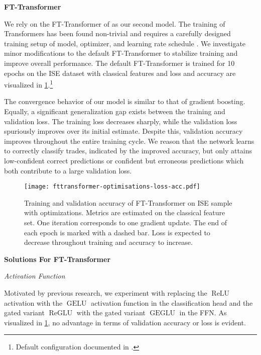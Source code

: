 \textbf{FT-Transformer}

We rely on the FT-Transformer of \textcite[][18935--18936]{gorishniyRevisitingDeepLearning2021} as our second model. The training of Transformers has been found non-trivial and requires a carefully designed training setup of model, optimizer, and learning rate schedule \autocite[][5747]{liuUnderstandingDifficultyTraining2020}. We investigate minor modifications to the default FT-Transformer to stabilize training and improve overall performance. The default FT-Transformer is trained for 10 epochs on the \gls{ISE} dataset with classical features and loss and accuracy are visualized in \cref{fig:fttransformer-optimizations-loss-acc}.\footnote{Default configuration documented in \textcite[][sup.]{gorishniyRevisitingDeepLearning2021}.}

The convergence behavior of our model is similar to that of gradient boosting. Equally, a significant generalization gap exists between the training and validation loss. The training loss decreases sharply, while the validation loss spuriously improves over its initial estimate. Despite this, validation accuracy improves throughout the entire training cycle. We reason that the network learns to correctly classify trades, indicated by the improved accuracy, but only attains low-confident correct predictions or confident but erroneous predictions which both contribute to a large validation loss.

\begin{figure}[!ht]
    \centering
    \texttt{[image: fttransformer-optimisations-loss-acc.pdf]}
    \caption[Training and Validation Accuracy of FT-Transformer with Optimisations]{Training and validation accuracy of FT-Transformer on \gls{ISE} sample with optimizations. Metrics are estimated on the classical feature set. One iteration corresponds to one gradient update. The end of each epoch is marked with a dashed bar. Loss is expected to decrease throughout training and accuracy to increase.}
    \label{fig:fttransformer-optimizations-loss-acc}
\end{figure}

\textbf{Solutions For FT-Transformer}

\emph{Activation Function}

Motivated by previous research, we experiment with replacing the $\operatorname{ReLU}$ activation with the $\operatorname{GELU}$ activation function \autocite[][2]{hendrycksGaussianErrorLinear2020} in the classification head and the gated variant $\operatorname{ReGLU}$ with the gated variant $\operatorname{GEGLU}$ \autocite[][2]{shazeerGLUVariantsImprove2020} in the \gls{FFN}. As visualized in \cref{fig:fttransformer-optimizations-loss-acc}, no advantage in terms of validation accuracy or loss is evident.

